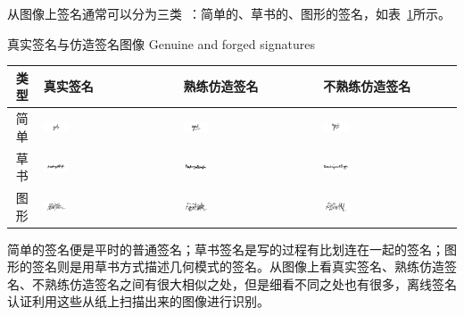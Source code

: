 从图像上签名通常可以分为三类~\cite{Hanmandlu2005Off}：简单的、草书的、图形的签名，如表~\ref{tab:signatures-images}所示。
\begin{table}[!hpb]
  \centering
  \bicaption
    {真实签名与仿造签名图像}
    {Genuine and forged signatures}
  \label{tab:signatures-images}
  \begin{tabular}{|c|m{}|m{}|m{}|} \toprule 
    类型 & 真实签名 & 熟练仿造签名 & 不熟练仿造签名\\ \midrule
   简单& \includegraphics[width=0.2\textwidth]{figure/signature-1.png}&\includegraphics[width=0.2\textwidth]{figure/signature-2.png}&\includegraphics[width=0.2\textwidth]{figure/signature-3.png} \\ \midrule
    草书&\includegraphics[width=0.2\textwidth]{figure/signature-4.png}&\includegraphics[width=0.2\textwidth]{figure/signature-5.png}&\includegraphics[width=0.2\textwidth]{figure/signature-6.png} \\ \midrule
    图形&\includegraphics[width=0.2\textwidth]{figure/signature-7.png}&\includegraphics[width=0.2\textwidth]{figure/signature-8.png}&\includegraphics[width=0.2\textwidth]{figure/signature-9.png} \\ 
        \bottomrule
  \end{tabular}
\end{table}
简单的签名便是平时的普通签名；草书签名是写的过程有比划连在一起的签名；图形的签名则是用草书方式描述几何模式的签名。从图像上看真实签名、熟练仿造签名、不熟练仿造签名之间有很大相似之处，但是细看不同之处也有很多，离线签名认证利用这些从纸上扫描出来的图像进行识别。

